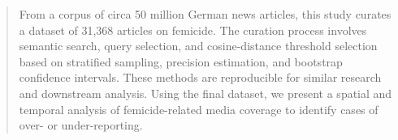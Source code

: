 \documentclass{article}
\begin{document}



\printAffiliationsAndNotice{\icmlEqualContribution} %
\begin{abstract}
From a corpus of circa 50 million German news articles, this study curates a dataset of 31,368 articles on femicide. The curation process involves semantic search, query selection, and cosine-distance threshold selection based on stratified sampling, precision estimation, and bootstrap confidence intervals. These methods are reproducible for similar research and downstream analysis. Using the final dataset, we present a spatial and temporal analysis of femicide-related media coverage to identify cases of over- or under-reporting.
\end{abstract}
\end{document}
